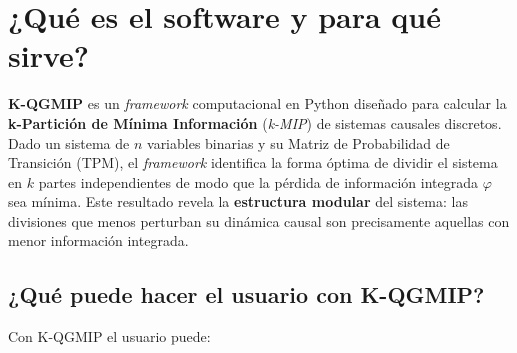 
\section{¿Qué es el software y para qué sirve?}

\textbf{K-QGMIP} es un \textit{framework} computacional en Python diseñado para calcular la
\textbf{k-Partición de Mínima Información} (\textit{k-MIP}) de sistemas causales discretos.
Dado un sistema de $n$ variables binarias y su Matriz de Probabilidad de Transición (TPM),
el \textit{framework} identifica la forma óptima de dividir el sistema en $k$ partes
independientes de modo que la pérdida de información integrada $\varphi$ sea mínima.
Este resultado revela la \textbf{estructura modular} del sistema: las divisiones que menos
perturban su dinámica causal son precisamente aquellas con menor información integrada.

\subsection*{¿Qué puede hacer el usuario con K-QGMIP?}

Con K-QGMIP el usuario puede:

